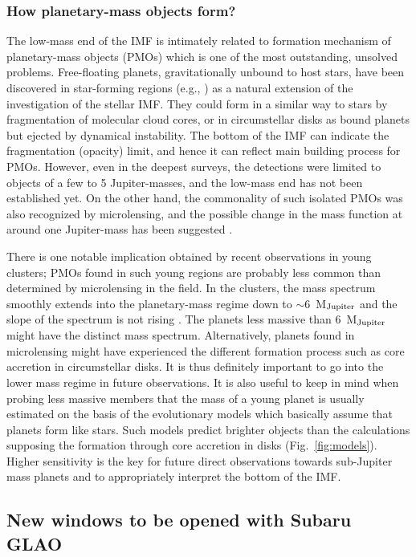 \subsubsection{How planetary-mass objects form?} 

The low-mass end of the IMF is intimately related to formation mechanism
of planetary-mass objects (PMOs) which is one of the most outstanding,
unsolved problems.  
Free-floating planets, gravitationally unbound to  host stars, have been
discovered in star-forming regions (e.g., \citealt{oas99}) as a natural
extension of the investigation of the stellar IMF. They could form in a
similar way to stars by fragmentation of molecular cloud cores, or in
circumstellar disks as bound planets but ejected by dynamical
instability. The bottom of the IMF can indicate the fragmentation
(opacity) limit, and hence it can reflect main building process for
PMOs. However, even in the deepest surveys, the detections were limited
to objects of a few to 5 Jupiter-masses, and the low-mass end has not
been established yet. On the other hand, the commonality of such
isolated PMOs was also recognized by microlensing, and the possible
change in the mass function at around one Jupiter-mass has been
suggested \citep{sum11}.  


There is one notable implication obtained by recent observations in
young clusters; PMOs found in such young regions are probably less
common than determined by microlensing in the field. In the clusters,
the mass spectrum smoothly extends into the planetary-mass regime down
to $\sim$6~M$_{\rm Jupiter}$ and the slope of the spectrum is not rising
\citep{sch12,pen12}. The planets less massive than 6~M$_{\rm Jupiter}$
might have the distinct mass spectrum. Alternatively, planets found in
microlensing might have experienced the different formation process such
as core accretion in circumstellar disks. It is thus definitely
important to go into the lower mass regime in future observations. It is
also useful to keep in mind when probing less massive members that the
mass of a young planet is usually estimated on the basis of the
evolutionary models which basically assume that planets form like
stars. Such models predict brighter objects than the calculations
supposing the formation through core accretion in  disks
(Fig.~\ref{fig:models}).  Higher sensitivity is the key for future
direct observations towards sub-Jupiter mass planets and to
appropriately interpret the bottom of the IMF. 


\subsection{New windows to be opened with Subaru GLAO}

